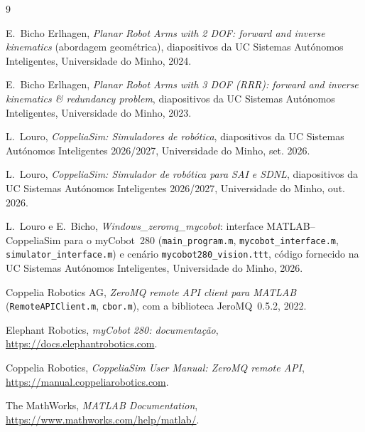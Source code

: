 \begin{thebibliography}{9}

E.~Bicho Erlhagen, \textit{Planar Robot Arms with 2 DOF: forward and inverse kinematics} (abordagem geométrica), diapositivos da UC Sistemas Autónomos Inteligentes, Universidade do Minho, 2024.

E.~Bicho Erlhagen, \textit{Planar Robot Arms with 3 DOF (RRR): forward and inverse kinematics \& redundancy problem}, diapositivos da UC Sistemas Autónomos Inteligentes, Universidade do Minho, 2023.

L.~Louro, \textit{CoppeliaSim: Simuladores de robótica}, diapositivos da UC Sistemas Autónomos Inteligentes 2026/2027, Universidade do Minho, set. 2026.

L.~Louro, \textit{CoppeliaSim: Simulador de robótica para SAI e SDNL}, diapositivos da UC Sistemas Autónomos Inteligentes 2026/2027, Universidade do Minho, out. 2026.

L.~Louro e E.~Bicho, \textit{Windows\_zeromq\_mycobot}: interface MATLAB--CoppeliaSim para o myCobot~280 (\texttt{main\_program.m}, \texttt{mycobot\_interface.m}, \texttt{simulator\_interface.m}) e cenário \texttt{mycobot280\_vision.ttt}, código fornecido na UC Sistemas Autónomos Inteligentes, Universidade do Minho, 2026.

Coppelia Robotics AG, \textit{ZeroMQ remote API client para MATLAB} (\texttt{RemoteAPIClient.m}, \texttt{cbor.m}), com a biblioteca JeroMQ~0.5.2, 2022.

Elephant Robotics, \textit{myCobot 280: documentação}, \url{https://docs.elephantrobotics.com}.

Coppelia Robotics, \textit{CoppeliaSim User Manual: ZeroMQ remote API}, \url{https://manual.coppeliarobotics.com}.

The MathWorks, \textit{MATLAB Documentation}, \url{https://www.mathworks.com/help/matlab/}.

\end{thebibliography}